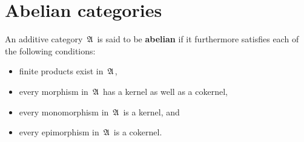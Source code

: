 

\section{Abelian categories}
\setcounter{theorem}{0}
\setcounter{equation}{0}


\renewcommand{\theenumi}{\roman{enumi}}
\renewcommand{\labelenumi}{\textnormal{(\theenumi)}$\;\;$}


\begin{definition}
\mbox{}
\vskip 0.15cm
\noindent
An additive category \,$\mathfrak{A}$\, is said to be \textbf{abelian}
if it furthermore satisfies each of the following conditions:
\begin{itemize}
\item
	finite products exist in \,$\mathfrak{A}$\,,
\item
	every morphism in \,$\mathfrak{A}$\, has a kernel as well as a cokernel,
\item
	every monomorphism in \,$\mathfrak{A}$\, is a kernel, and
\item
	every epimorphism in \,$\mathfrak{A}$\, is a cokernel.
\end{itemize}
\end{definition}





